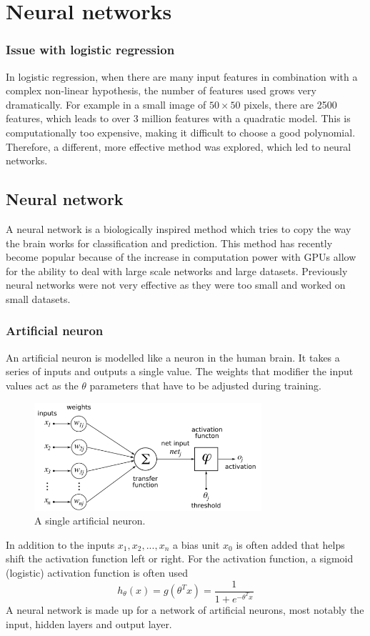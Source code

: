 \documentclass[CS5104-Notes.tex]{subfiles}
\begin{document}
\section{Neural networks}

\subsubsection{Issue with logistic regression}
In logistic regression, when there are many input features in combination with a complex non-linear hypothesis, the number of features used grows very dramatically. For example in a small image of $50\times50$ pixels, there are 2500 features, which leads to over 3 million features with a quadratic model. This is computationally too expensive, making it difficult to choose a good polynomial.
\n
Therefore, a different, more effective method was explored, which led to neural networks.

\subsection{Neural network}
A neural network is a biologically inspired method which tries to copy the way the brain works for classification and prediction. This method has recently become popular because of the increase in computation power with GPUs allow for the ability to deal with large scale networks and large datasets. Previously neural networks were not very effective as they were too small and worked on small datasets.

\subsubsection{Artificial neuron}
An artificial neuron is modelled like a neuron in the human brain. It takes a series of inputs and outputs a single value. The weights that modifier the input values act as the $\theta$ parameters that have to be adjusted during training. 
\begin{figure}[H]
  \centering
  \includegraphics[width=0.75\textwidth, keepaspectratio]{imgs/artificial-neuron.png}
  \caption{A single artificial neuron.}
\end{figure}
\noindent
In addition to the inputs $x_{1}, x_{2}, ..., x_{n}$ a bias unit $x_{0}$ is often added that helps shift the activation function left or right. For the activation function, a sigmoid (logistic) activation function is often used
\begin{equation}
h_{\theta}(x) = g(\theta^{T}x) = \frac{1}{1 + e^{-\theta^{T}x}}
\end{equation}
A neural network is made up for a network of artificial neurons, most notably the input, hidden layers and output layer.
\end{document}
